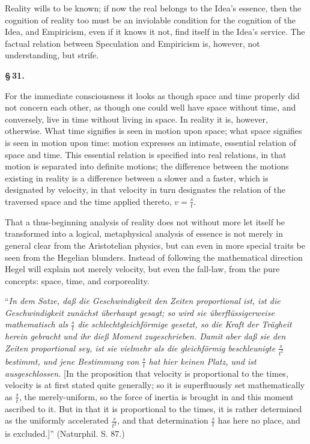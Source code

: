 \documentclass[12pt]{book}
\begin{document}
Reality wills to be known; if now the real belongs to the Idea's essence, then the cognition of reality
too must be an inviolable condition for the cognition of the Idea, and Empiricism, even if it knows it
not, find itself in the Idea's service. The factual relation between Speculation and Empiricism is,
however, not understanding, but strife.

\begin{center}{\bfseries \S\,31.}\end{center}

For the immediate consciousness it looks as though space and time properly did not concern each other,
as though one could well have space without time, and conversely, live in time without living in space.
In reality it is, however, otherwise. What time signifies is seen in motion upon space; what space
signifies is seen in motion upon time: motion expresses an intimate, essential relation of space and
time. This essential relation is specified into real relations, in that motion is separated into
definite motions; the difference between the motions existing in reality is a difference between a
slower and a faster, which is designated by velocity, in that velocity in turn designates the relation
of the traversed space and the time applied thereto, $v=\frac{s}{t}$.

That a thus-beginning analysis of reality does not without more let itself be transformed into a
logical, metaphysical analysis of essence is not merely in general clear from the Aristotelian physics,
but can even in more special traits be seen from the Hegelian blunders. Instead of following the
mathematical direction
Hegel will explain not merely velocity, but even the fall-law, from the pure concepts: space, time,
and corporeality.

``\textit{In dem Satze, daß die Geschwindigkeit den Zeiten proportional ist, ist die Geschwindigkeit
zunächst überhaupt gesagt; so wird sie überflüssigerweise mathematisch als} $\frac{s}{t}$ \textit{die
schlechtgleichförmige gesetzt, so die Kraft der Trägheit herein gebracht und ihr dieß Moment
zugeschrieben. Damit aber daß sie den Zeiten proportional sey, ist sie vielmehr als die gleichförmig
beschleunigte} $\frac{s}{t^2}$ \textit{bestimmt, und jene Bestimmung von} $\frac{s}{t}$ \textit{hat
hier keinen Platz, und ist ausgeschlossen.} [In the proposition that velocity is proportional to the
times, velocity is at first stated quite generally; so it is superfluously set mathematically as
$\frac{s}{t}$, the merely-uniform, so the force of inertia is brought in and this moment ascribed to
it. But in that it is proportional to the times, it is rather determined as the uniformly accelerated
$\frac{s}{t^2}$, and that determination $\frac{s}{t}$ has here no place, and is excluded.]''
(Naturphil. S. 87.)
\end{document}
